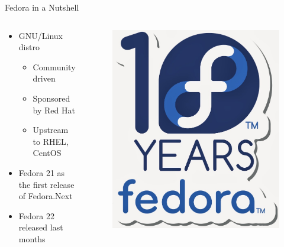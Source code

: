 \documentclass{beamer}
\begin{document}
\begin{frame}{Fedora in a Nutshell}
  \begin{columns}
    \begin{column}{.5\textwidth}
  \begin{itemize}
    \item GNU/Linux distro
      \begin{itemize}
        \item Community driven
        \item Sponsored by Red Hat
        \item Upstream to RHEL, CentOS
      \end{itemize}
    \item Fedora 21 as the first release of Fedora.Next
    \item Fedora 22 released last months
  \end{itemize}
    \end{column}
    \begin{column}{.5\textwidth}
      \begin{figure}[htbp]
        \centering
        \includegraphics[width=.6\textwidth]{tenyears.jpeg}
      \end{figure}
    \end{column}
  \end{columns}
\end{frame}
\end{document}
